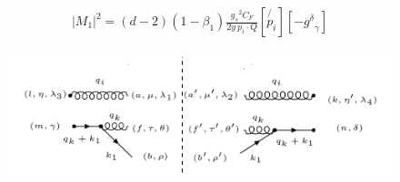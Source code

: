 %
%
%

\begin{equation}
\begin{split}
|M_1|^2=(d-2)(1-\beta_1)\frac{{g_s}^2 C_F}{2y \:p_i \cdot Q}
[  \not{p_i}][-{g^{\delta}}_{\gamma}]
\end{split}
\end{equation}


\begin{figure}[ht!]
\centering
\includegraphics[scale=0.7]{images/GQ/M2Squer.png}
\end{figure}

